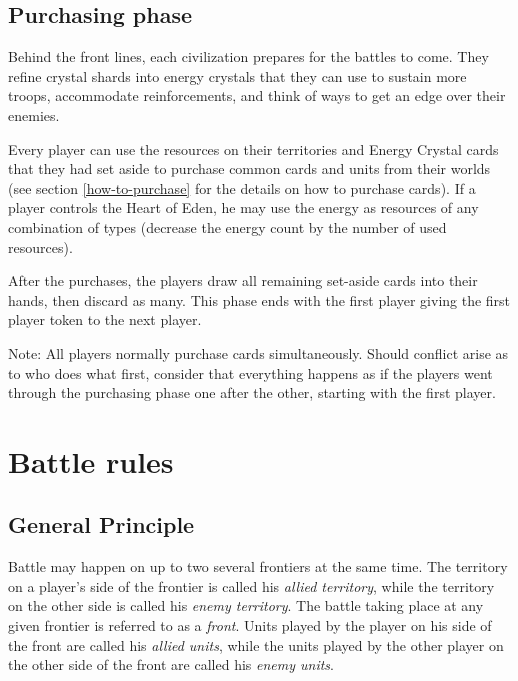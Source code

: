 \documentclass[a4paper]{article}
\begin{document}
    
    \subsection{Purchasing phase}
        \label{purchase}
        Behind the front lines, each civilization prepares for the battles to come.
        They refine crystal shards into energy crystals that they can use to
        sustain more troops, accommodate reinforcements,
        and think of ways to get an edge over their enemies.
        
        Every player can use the resources on their territories and Energy Crystal cards
        that they had set aside to purchase common cards and units from their worlds
        (see section \ref{how-to-purchase} for the details on how to purchase cards).
        If a player controls the Heart of Eden, he may use the energy as resources
        of any combination of types (decrease the energy count by the number
        of used resources).
        
        After the purchases, the players draw all remaining set-aside cards into their
        hands, then discard as many.        
        This phase ends with the first player giving the first player token
        to the next player.
        
        Note: All players normally purchase cards simultaneously.
        Should conflict arise as to who does what first,
        consider that everything happens as if the players went through
        the purchasing phase one after the other, starting with the first player.


\newpage
\section{Battle rules}
    \label{battle-rules}
    
    \subsection{General Principle}
        Battle may happen on up to two several frontiers at the same time.
        The territory on a player's side of the frontier is called his \textit{allied territory},
        while the territory on the other side is called his \textit{enemy territory}.
        The battle taking place at any given frontier is referred to as a \textit{front}.
        Units played by the player on his side of the front are called his
        \textit{allied units}, while the units played by the other player on the other
        side of the front are called his \textit{enemy units}.
        
\end{document}
